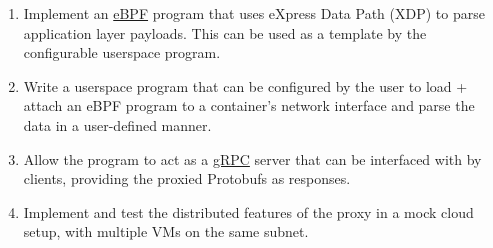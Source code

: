 \documentclass[12pt]{article}
\begin{document}
\begin{enumerate}
    \item Implement an \href{http://ebpf.io}{eBPF} program that uses eXpress Data Path (XDP) to parse application layer payloads. This can be used as a template by the configurable userspace program.
    \item Write a userspace program that can be configured by the user to load + attach an eBPF program to a container's network interface and parse the data in a user-defined manner.
    \item Allow the program to act as a \href{http://grpc.io}{gRPC} server that can be interfaced with by clients, providing the proxied Protobufs as responses.
    \item Implement and test the distributed features of the proxy in a mock cloud setup, with multiple VMs on the same subnet.
\end{enumerate}
\end{document}
